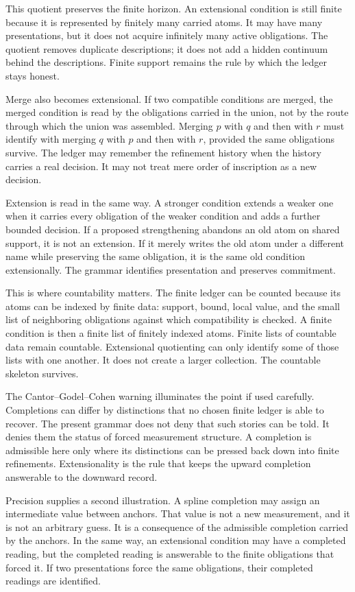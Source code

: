 This quotient preserves the finite horizon. An extensional condition is still
finite because it is represented by finitely many carried atoms. It may have
many presentations, but it does not acquire infinitely many active
obligations. The quotient removes duplicate descriptions; it does not add a
hidden continuum behind the descriptions. Finite support remains the rule by
which the ledger stays honest.

Merge also becomes extensional. If two compatible conditions are merged, the
merged condition is read by the obligations carried in the union, not by the
route through which the union was assembled. Merging \(p\) with \(q\) and
then with \(r\) must identify with merging \(q\) with \(p\) and then with
\(r\), provided the same obligations survive. The ledger may remember the
refinement history when the history carries a real decision. It may not treat
mere order of inscription as a new decision.

Extension is read in the same way. A stronger condition extends a weaker one
when it carries every obligation of the weaker condition and adds a further
bounded decision. If a proposed strengthening abandons an old atom on shared
support, it is not an extension. If it merely writes the old atom under a
different name while preserving the same obligation, it is the same old
condition extensionally. The grammar identifies presentation and preserves
commitment.

This is where countability matters. The finite ledger can be counted because
its atoms can be indexed by finite data: support, bound, local value, and the
small list of neighboring obligations against which compatibility is checked.
A finite condition is then a finite list of finitely indexed atoms. Finite lists
of countable data remain countable. Extensional quotienting can only identify
some of those lists with one another. It does not create a larger collection.
The countable skeleton survives.

The Cantor--Godel--Cohen warning illuminates the point if used carefully.
Completions can differ by distinctions that no chosen finite ledger is able
to recover. The present grammar does not deny that such stories can be told.
It denies them the status of forced measurement structure. A completion is
admissible here only where its distinctions can be pressed back down into
finite refinements. Extensionality is the rule that keeps the upward
completion answerable to the downward record.

Precision supplies a second illustration. A spline completion may assign an
intermediate value between anchors. That value is not a new measurement, and
it is not an arbitrary guess. It is a consequence of the admissible completion
carried by the anchors. In the same way, an extensional condition may have a
completed reading, but the completed reading is answerable to the finite
obligations that forced it. If two presentations force the same obligations,
their completed readings are identified.

